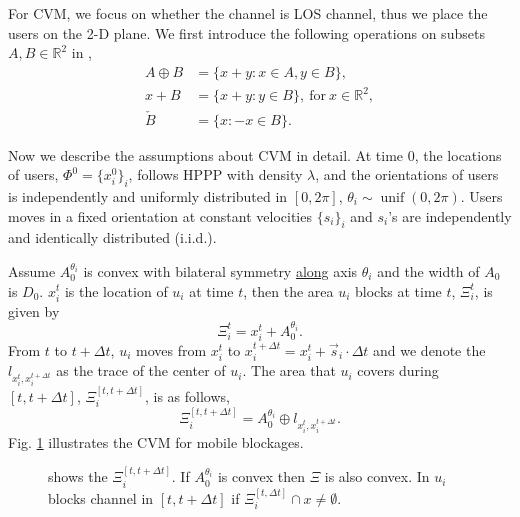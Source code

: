 \documentclass[10pt, conference, letterpaper]{IEEEtran}
\DeclareMathOperator*{\unif}{unif}
\begin{document}
For CVM, we focus on whether the channel is LOS channel, thus we place the users on the 2-D plane. 
We first introduce the following operations on subsets $A, B\in \mathbb{R}^2$ in \cite{stochasticgeometry}, 
\begin{equation*}
\begin{split}
A \oplus B & = \{x+y:x\in A, y\in B\},\\
x + B & = \{x+y:y\in B\}, \mathrm{~for~} x\in \mathbb{R}^2, \\
\check{B} & = \{x: -x \in B\}.
\end{split}
\end{equation*}

Now we describe the assumptions about CVM in detail. 
At time $0$, the locations of users, $\Phi^0 = \{x_i^0\}_i$, follows HPPP with density $\lambda$, and the orientations of users is independently and uniformly distributed in $[0, 2\pi]$, $\theta_i \sim \unif(0, 2\pi)$. 
Users moves in a fixed orientation at constant velocities $\{s_i\}_i$ and $s_i$'s are independently and identically distributed (i.i.d.).

Assume $A_0^{\theta_i}$ is convex with bilateral symmetry \underline{along} axis $\theta_i$ and the width of $A_0$ is $D_0$. $x_i^t$ is the location of $u_i$ at time $t$, then the area $u_i$ blocks at time $t$, $\Xi_{i}^t$, is given by 
\begin{equation*}
\Xi_{i}^t = x_i^t + A_0^{\theta_i}.
\end{equation*}
From $t$ to $t+\Delta t$, $u_i$ moves from $x_i^t$ to $x_i^{t+\Delta t} = x_i^t + \vec{s}_i\cdot \Delta t$ and we denote the $l_{x_i^t, x_i ^{t+\Delta t}}$ as the trace of the center of $u_i$. The area that $u_i$ covers during $[t, t+\Delta t]$, $\Xi_i^{[t, t+\Delta t]}$, is as follows, 
\begin{equation*} %
\Xi_i^{[t, t+\Delta t]} = A_0^{\theta_i} \oplus l_{x_i^t, x_i ^{t+\Delta t} }.
\end{equation*}
Fig. \ref{fig:boolean} illustrates the CVM for mobile blockages.

\begin{figure}
	\centering
	\mbox{}
	\mbox{}
	\caption[]{ shows the $\Xi_i^{[t, t+\Delta t]}$. If $A_0^{\theta_i}$ is convex then $\Xi$ is also convex. In  $u_i$ blocks channel in $[t, t+ \Delta t]$ if $\Xi_i^{[t, \Delta t]}\cap x \neq \emptyset$. }
	\label{fig:boolean}
\end{figure}
\end{document}
